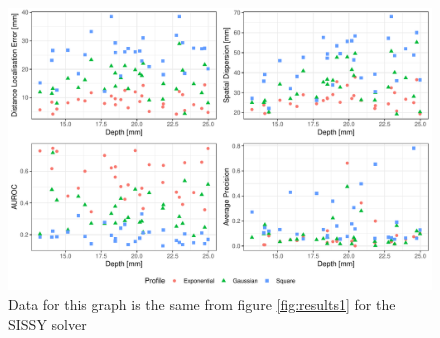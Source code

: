 \begin{figure}
    \centering
    \includegraphics[width=0.9\linewidth]{img_stats/SISSY_scatter_EvalMetrics_Protocol04_30.pdf}
    \caption{Data for this graph is the same from figure \ref{fig:results1} for the SISSY solver}
    \label{fig:deets_SISSY}
\end{figure}

